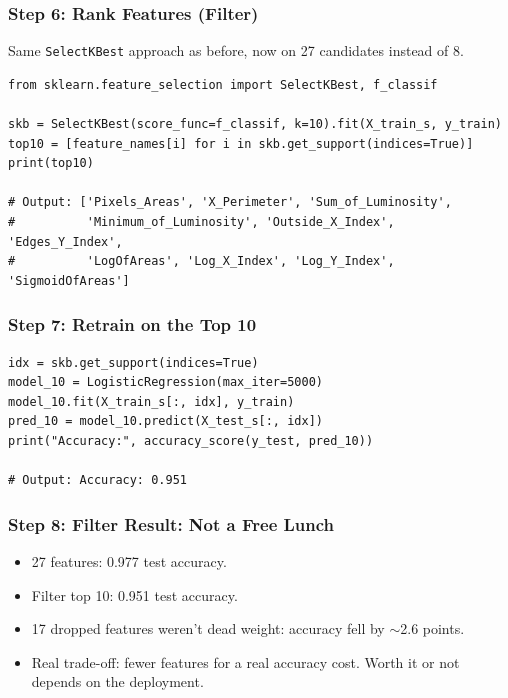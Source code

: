 \begin{frame}[fragile]\frametitle{Step 6: Rank Features (Filter)}
Same \texttt{SelectKBest} approach as before, now on 27 candidates instead of 8.
\begin{lstlisting}
from sklearn.feature_selection import SelectKBest, f_classif

skb = SelectKBest(score_func=f_classif, k=10).fit(X_train_s, y_train)
top10 = [feature_names[i] for i in skb.get_support(indices=True)]
print(top10)

# Output: ['Pixels_Areas', 'X_Perimeter', 'Sum_of_Luminosity',
#          'Minimum_of_Luminosity', 'Outside_X_Index', 'Edges_Y_Index',
#          'LogOfAreas', 'Log_X_Index', 'Log_Y_Index', 'SigmoidOfAreas']
\end{lstlisting}
\end{frame}

\begin{frame}[fragile]\frametitle{Step 7: Retrain on the Top 10}
\begin{lstlisting}
idx = skb.get_support(indices=True)
model_10 = LogisticRegression(max_iter=5000)
model_10.fit(X_train_s[:, idx], y_train)
pred_10 = model_10.predict(X_test_s[:, idx])
print("Accuracy:", accuracy_score(y_test, pred_10))

# Output: Accuracy: 0.951
\end{lstlisting}
\end{frame}

\begin{frame}[fragile]\frametitle{Step 8: Filter Result: Not a Free Lunch}
\begin{itemize}
\item 27 features: 0.977 test accuracy.
\item Filter top 10: 0.951 test accuracy.
\item 17 dropped features weren't dead weight: accuracy fell by $\sim$2.6 points.
\item Real trade-off: fewer features for a real accuracy cost. Worth it or not depends on the deployment.
\end{itemize}
\end{frame}

